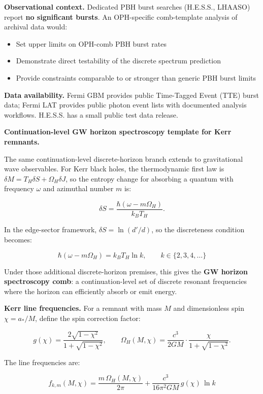 \textbf{Observational context.} Dedicated PBH burst searches (H.E.S.S., LHAASO) report \textbf{no significant bursts}. An OPH-specific comb-template analysis of archival data would:

\begin{itemize}
\tightlist
\item
  Set upper limits on OPH-comb PBH burst rates
\item
  Demonstrate direct testability of the discrete spectrum prediction
\item
  Provide constraints comparable to or stronger than generic PBH burst limits
\end{itemize}

\textbf{Data availability.} Fermi GBM provides public Time-Tagged Event (TTE) burst data; Fermi LAT provides public photon event lists with documented analysis workflows. H.E.S.S. has a small public test data release.

\textbf{Continuation-level GW horizon spectroscopy template for Kerr remnants.}

The same continuation-level discrete-horizon branch extends to gravitational wave observables. For Kerr black holes, the thermodynamic first law is \(\delta M = T_H \delta S +
\Omega_H \delta J\), so the entropy change for absorbing a quantum with frequency \(\omega\) and azimuthal number \(m\) is:

\[
\delta S = \frac{\hbar(\omega - m\Omega_H)}{k_B T_H}.
\]

In the edge-sector framework, \(\delta S = \ln(d'/d)\), so the discreteness condition becomes:

\[
\hbar(\omega - m\Omega_H) = k_B T_H \ln k, \qquad k \in \{2, 3, 4, \ldots\}
\]

Under those additional discrete-horizon premises, this gives the \textbf{GW horizon spectroscopy comb}: a continuation-level set of discrete resonant frequencies where the horizon can efficiently absorb or emit energy.

\textbf{Kerr line frequencies.} For a remnant with mass \(M\) and dimensionless spin \(\chi = a_*/M\), define the spin correction factor:

\[
g(\chi) = \frac{2\sqrt{1-\chi^2}}{1+\sqrt{1-\chi^2}}, \qquad
\Omega_H(M,\chi) = \frac{c^3}{2GM} \cdot \frac{\chi}{1+\sqrt{1-\chi^2}}.
\]

The line frequencies are:

\[
f_{k,m}(M,\chi) = \frac{m \, \Omega_H(M,\chi)}{2\pi} + \frac{c^3}{16\pi^2 GM} \, g(\chi) \, \ln k
\]

